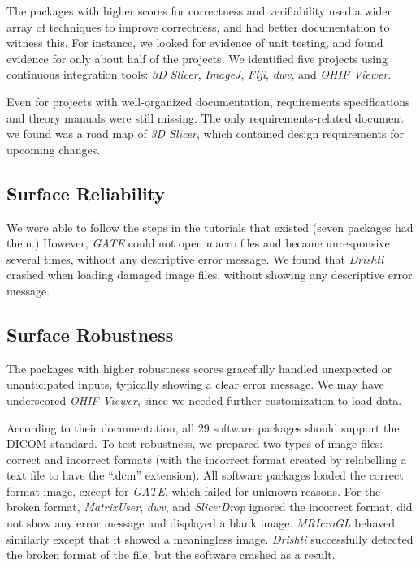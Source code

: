 \documentclass[final, 12pt, 3p, times]{elsarticle}
\begin{document}
The packages with higher scores for correctness and verifiability used a wider array of
techniques to improve correctness, and had better documentation to witness this.
For instance, we looked for evidence of unit testing, and found evidence for
only about half of the projects. We identified five projects using continuous
integration tools: \textit{3D Slicer}, \textit{ImageJ}, \textit{Fiji},
\textit{dwv}, and \textit{OHIF Viewer}. 

Even for projects with well-organized documentation, requirements
specifications and theory manuals were still missing.
The only requirements-related document we found was a road
map of \textit{3D Slicer}, which contained design requirements for upcoming
changes.

\subsection{Surface Reliability} \label{sec_result_reliability}

We were able to follow the steps in the tutorials that existed (seven packages
had them.) However, \textit{GATE} could not open macro files and became
unresponsive several times, without any descriptive error message. We found that
\textit{Drishti} crashed when loading damaged image files, without showing any
descriptive error message.

\subsection{Surface Robustness} \label{sec_result_robustness}

The packages with higher robustness scores gracefully handled unexpected or unanticipated
inputs, typically showing a clear error message. We may have underscored
\textit{OHIF Viewer}, since we needed further customization to load
data.

According to their documentation, all 29 software packages should support the
DICOM standard. To test robustness, we prepared two types of image files:
correct and incorrect formats (with the incorrect format created by relabelling a
text file to have the ``.dcm'' extension).  All software packages loaded the
correct format image, except for \textit{GATE}, which failed for unknown
reasons.  For the broken format, \textit{MatrixUser}, \textit{dwv}, and
\textit{Slice:Drop} ignored the incorrect format,
did not show any error message and displayed a blank image.
\textit{MRIcroGL} behaved similarly except that it showed a meaningless image.
\textit{Drishti} successfully detected the broken format of the file, but the
software crashed as a result.
\end{document}
